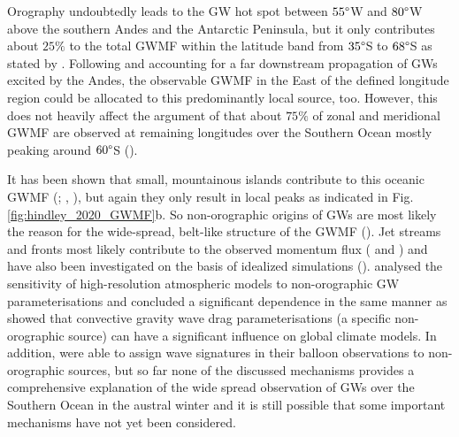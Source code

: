 Orography undoubtedly leads to the GW hot spot between $55 \degree$W and $80 \degree$W above the southern Andes and the Antarctic Peninsula,  but it only contributes about $25 \%$ to the total GWMF within the latitude band from $35 \degree$S to $68 \degree$S as stated by \textcite{hindley_18year_2020}. Following \textcite{sato_gravity_2012} and accounting for a far downstream propagation of GWs excited by the Andes, the observable GWMF in the East of the defined longitude region could be allocated to this predominantly local source, too. However, this does not heavily affect the argument of \textcite{hindley_18year_2020} that about $75 \%$ of zonal and meridional GWMF are observed at remaining longitudes over the Southern Ocean mostly peaking around $60 \degree$S (\cite{hindley_18year_2020}).

It has been shown that small, mountainous islands contribute to this oceanic GWMF (\cite{garfinkel_effect_2018}; \cite{mclandress_is_2012}, \cite{alexander_momentum_2009}), but again they only result in local peaks as indicated in Fig. \ref{fig:hindley_2020_GWMF}b. So non-orographic origins of GWs are most likely the reason for the wide-spread, belt-like structure of the GWMF (\cite{hendricks_what_2014}). Jet streams and fronts most likely contribute to the observed momentum flux (\cite{plougonven_internal_2014} and \cite{hendricks_what_2014}) and have also been investigated on the basis of idealized simulations (\cite{osullivan_generation_1995}). \textcite{polichtchouk_sensitivity_2018} analysed the sensitivity of high-resolution atmospheric models to non-orographic GW parameterisations and concluded a significant dependence in the same manner as \textcite{choi_effects_2013} showed that convective gravity wave drag parameterisations (a specific non-orographic source) can have a significant influence on global climate models. In addition, \textcite{jewtoukoff_comparison_2015} were able to assign wave signatures in their balloon observations to non-orographic sources, but so far none of the discussed mechanisms provides a comprehensive explanation of the wide spread observation of GWs over the Southern Ocean in the austral winter and it is still possible that some important mechanisms have not yet been considered.

